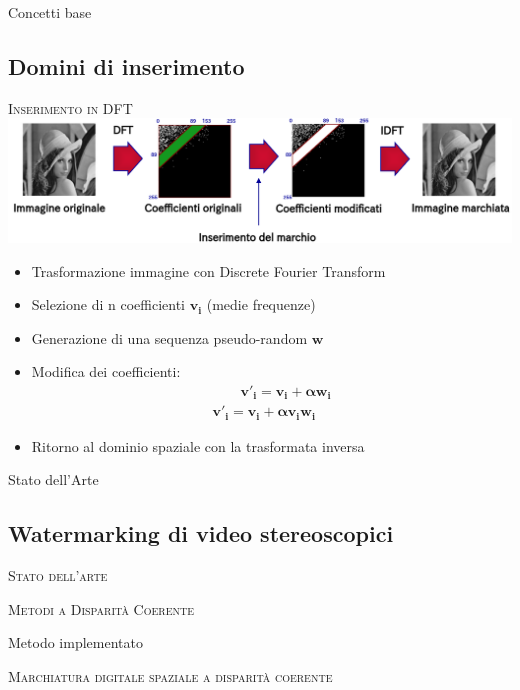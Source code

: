 \documentclass{beamer}
\begin{document}
\begin{section}{Concetti base}
\subsection{Domini di inserimento}
\begin{frame}[t]{\textsc{Inserimento in DFT}}
\vspace{1em}
\centering
\includegraphics[width=1\linewidth]{./img/dft.png}
\begin{itemize}
\item Trasformazione immagine con Discrete Fourier Transform
\item Selezione di n coefficienti $\mathbf{v_i}$ (medie frequenze)
\item Generazione di una sequenza pseudo-random $\mathbf{w}$
\item Modifica dei coefficienti: 
\vspace{-2.3em}
 \begin{align*} 
\qquad \mathbf{v'_{i} = v_i + \alpha w_{i}}\\
\mathbf{v'_{i} = v_i + \alpha v_i  w_{i}}
\end{align*}
\vspace{-2.5em}
\item Ritorno al dominio spaziale con la trasformata inversa
\end{itemize}

\end{frame}





\end{section}
\begin{section}{Stato dell'Arte}
\subsection{Watermarking di video stereoscopici}
\begin{frame}[t]{\textsc{Stato dell'arte}}

\end{frame}

\begin{frame}[t]{\textsc{Metodi a Disparit\`{a} Coerente}}
\end{frame}

\end{section}

\begin{section}{Metodo implementato}
\begin{frame}[t]{\textsc{Marchiatura digitale spaziale a disparit\`{a} coerente}}

\end{frame}
\end{section}
\end{document}
